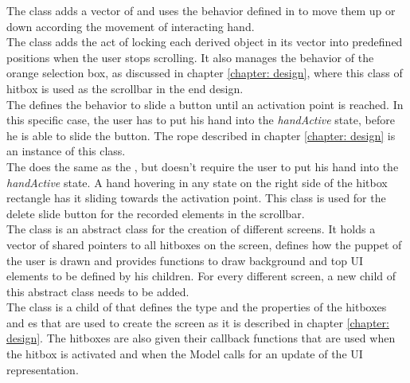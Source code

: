 The  class adds a vector of  and uses the behavior defined in  to move them up or down according the movement of interacting hand.\\

The  class adds the act of locking each  derived object in its vector into predefined positions when the user stops scrolling. It also manages the behavior of the orange selection box, as discussed in chapter \ref{chapter: design}, where this class of hitbox is used as the scrollbar in the end design.\\

The  defines the behavior to slide a button until an activation point is reached. In this specific case, the user has to put his hand into the \emph{handActive} state, before he is able to slide the button. The rope described in chapter \ref{chapter: design} is an instance of this class.\\

The  does the same as the , but doesn't require the user to put his hand into the \emph{handActive} state. A hand hovering in any state on the right side of the hitbox rectangle has it sliding towards the activation point. This class is used for the delete slide button for the recorded elements in the scrollbar.\\

The  class is an abstract class for the creation of different screens. It holds a vector of shared pointers to all hitboxes on the screen, defines how the puppet of the user is drawn and provides functions to draw background and top UI elements to be defined by his children. For every different screen, a new child of this abstract class needs to be added.\\

The  class is a child of  that defines the type and the properties of the hitboxes and es that are used to create the screen as it is described in chapter \ref{chapter: design}. The hitboxes are also given their callback functions that are used when the hitbox is activated and when the Model calls for an update of the UI representation.


